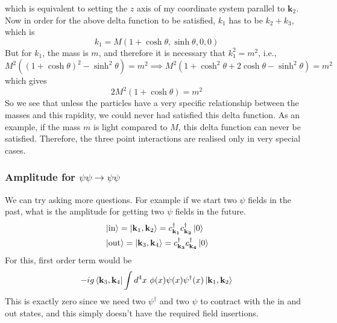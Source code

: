 \documentclass[11pt, notitlepage]{report}
\newcommand{\cdag}[1]{c^\dagger_\mathbf{#1}}
\numberwithin{equation}{section}
\begin{document}
    which is equivalent to setting the \(z\) axis of my coordinate system parallel to \(\textbf{k}_2\). \\
    Now in order for the above delta function to be satisfied, \(k_1\) has to be \(k_2 + k_3\), which is  
    \begin{equation*}
        k_1 = M(1+\cosh\theta, \sinh\theta, 0, 0)
    \end{equation*}
    But for \(k_1\), the mass is \(m\), and therefore it is necessary that \(k_1^2 = m^2\), i.e.,
    \begin{equation*}
        M^2((1+\cosh\theta)^2 - \sinh^2\theta) = m^2 \implies M^2(1 + \cosh^2\theta + 2\cosh\theta - \sinh^2\theta) = m^2
    \end{equation*}
    which gives 
    \begin{equation*}
        2M^2(1+\cosh\theta) = m^2
    \end{equation*}
    So we see that unless the particles have a very specific relationship between the masses and this rapidity, we could never had satisfied this delta function. As an example, if the mass \(m\) is light compared to \(M\), this delta function can never be satisfied. Therefore, the three point interactions are realised only in very special cases.
    
    \subsubsection{Amplitude for \(\psi\psi\to\psi\psi\)}

    We can try asking more questions. For example if we start two \(\psi\) fields in the past, what is the amplitude for getting two \(\psi\) fields in the future. 
    \begin{align*}
        &\ket{\text{in}} = \ket{\textbf{k}_1, \textbf{k}_2} = \cdag{k_1}\cdag{k_2}\ket{0}\\
        &\ket{\text{out}} = \ket{\textbf{k}_3, \textbf{k}_4} = \cdag{k_3}\cdag{k_4}\ket{0}\\
    \end{align*}
    For this, first order term would be 
    \begin{equation*}
        -ig\bra{\textbf{k}_3, \textbf{k}_4}\int d^4 x ~ \phi(x) \psi(x) \psi^\dagger(x) \ket{\textbf{k}_1, \textbf{k}_2}
    \end{equation*}
    This is exactly zero since we need two \(\psi^\dagger\) and two \(\psi\) to contract with the in and out states, and this simply doesn't have the required field insertions. \\
\end{document}
